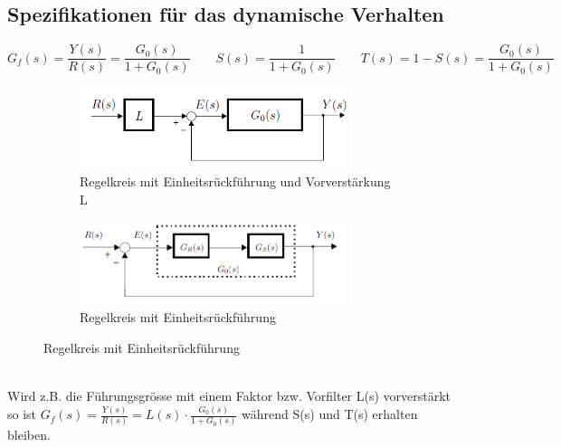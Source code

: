 \subsection{Spezifikationen für das dynamische Verhalten}
\begin{equation}
	G_f(s)=\frac{Y(s)}{R(s)}=\frac{G_0(s)}{1+G_0(s)} \qquad S(s)=\frac{1}{1+G_0(s)} \qquad T(s)=1-S(s)=\frac{G_0(s)}{1+G_0(s)}
\end{equation}
\begin{figure}[h!]
	\begin{center}
	\begin{subfigure}[b]{8cm}
		\centering
		\includegraphics[width=8cm]{./images/regelkreismitL.png}
		\caption{Regelkreis mit Einheitsrückführung und Vorverstärkung L}
	\end{subfigure}\qquad
	\begin{subfigure}[b]{8cm}
		\centering
		\includegraphics[width=8cm]{./images/RegelkreisEinheitsrueckfuehrung.png}
		\caption{Regelkreis mit Einheitsrückführung}
	\end{subfigure}
	\end{center}
\end{figure}\\
	Wird z.B. die Führungsgrösse mit einem Faktor bzw. Vorfilter L(s) vorverstärkt so ist $G_f(s)=\frac{Y(s)}{R(s)}=L(s)\cdot\frac{G_0(s)}{1+G_0(s)}$ während S(s) und T(s) erhalten bleiben.
%

